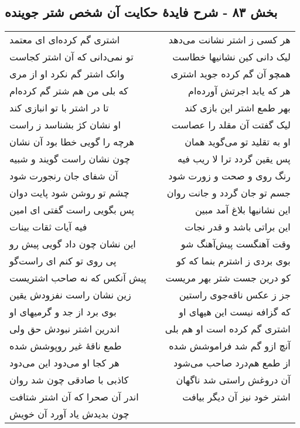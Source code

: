 \begin{center}
\section*{بخش ۸۳ - شرح فایدهٔ حکایت آن شخص شتر جوینده}
\label{sec:sh083}
\begin{longtable}{l p{0.5cm} r}
اشتری گم کرده‌ای ای معتمد
&&
هر کسی ز اشتر نشانت می‌دهد
\\
تو نمی‌دانی که آن اشتر کجاست
&&
لیک دانی کین نشانیها خطاست
\\
وانک اشتر گم نکرد او از مری
&&
همچو آن گم کرده جوید اشتری
\\
که بلی من هم شتر گم کرده‌ام
&&
هر که یابد اجرتش آورده‌ام
\\
تا در اشتر با تو انبازی کند
&&
بهر طمع اشتر این بازی کند
\\
او نشان کژ بشناسد ز راست
&&
لیک گفتت آن مقلد را عصاست
\\
هرچه را گویی خطا بود آن نشان
&&
او به تقلید تو می‌گوید همان
\\
چون نشان راست گویند و شبیه
&&
پس یقین گردد ترا لا ریب فیه
\\
آن شفای جان رنجورت شود
&&
رنگ روی و صحت و زورت شود
\\
چشم تو روشن شود پایت دوان
&&
جسم تو جان گردد و جانت روان
\\
پس بگویی راست گفتی ای امین
&&
این نشانیها بلاغ آمد مبین
\\
فیه آیات ثقات بینات
&&
این براتی باشد و قدر نجات
\\
این نشان چون داد گویی پیش رو
&&
وقت آهنگست پیش‌آهنگ شو
\\
پی روی تو کنم ای راست‌گو
&&
بوی بردی ز اشترم بنما که کو
\\
پیش آنکس که نه صاحب اشتریست
&&
کو درین جست شتر بهر مریست
\\
زین نشان راست نفزودش یقین
&&
جز ز عکس ناقه‌جوی راستین
\\
بوی برد از جد و گرمیهای او
&&
که گزافه نیست این هیهای او
\\
اندرین اشتر نبودش حق ولی
&&
اشتری گم کرده است او هم بلی
\\
طمع ناقهٔ غیر روپوشش شده
&&
آنچ ازو گم شد فراموشش شده
\\
هر کجا او می‌دود این می‌دود
&&
از طمع هم‌درد صاحب می‌شود
\\
کاذبی با صادقی چون شد روان
&&
آن دروغش راستی شد ناگهان
\\
اندر آن صحرا که آن اشتر شتافت
&&
اشتر خود نیز آن دیگر بیافت
\\
چون بدیدش یاد آورد آن خویش

\end{longtable}
\end{center}
